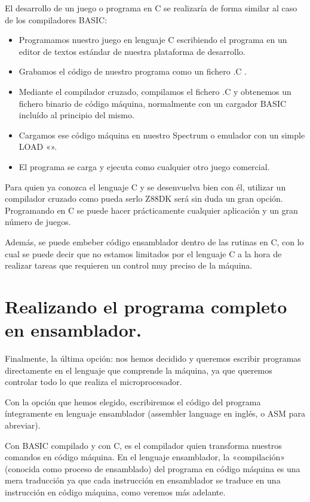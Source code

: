 \documentclass[letterpaper,10pt,spanish]{sphinxmanual}
\begin{document}
El desarrollo de un juego o programa en C se realizaría de forma similar al caso de los compiladores BASIC:
\begin{itemize}
\item {} 
Programamos nuestro juego en lenguaje C escribiendo el programa en un editor de textos estándar de nuestra plataforma de desarrollo.

\item {} 
Grabamos el código de nuestro programa como un fichero .C .

\item {} 
Mediante el compilador cruzado, compilamos el fichero .C y obtenemos un fichero binario de código máquina, normalmente con un cargador BASIC incluído al principio del mismo.

\item {} 
Cargamos ese código máquina en nuestro Spectrum o emulador con un simple LOAD «».

\item {} 
El programa se carga y ejecuta como cualquier otro juego comercial.

\end{itemize}

Para quien ya conozca el lenguaje C y se desenvuelva bien con él, utilizar un compilador cruzado como pueda serlo Z88DK será sin duda un gran opción. Programando en C se puede hacer prácticamente cualquier aplicación y un gran número de juegos.

Además, se puede embeber código ensamblador dentro de las rutinas en C, con lo cual se puede decir que no estamos limitados por el lenguaje C a la hora de realizar tareas que requieren un control muy preciso de la máquina.


\section{Realizando el programa completo en ensamblador.}
\label{\detokenize{02_introduccion/introduccion:realizando-el-programa-completo-en-ensamblador}}
Finalmente, la última opción: nos hemos decidido y queremos escribir programas directamente en el lenguaje que comprende la máquina, ya que queremos controlar todo lo que realiza el microprocesador.

Con la opción que hemos elegido, escribiremos el código del programa íntegramente en lenguaje ensamblador (assembler language en inglés, o ASM para abreviar).

Con BASIC compilado y con C, es el compilador quien transforma nuestros comandos en código máquina. En el lenguaje ensamblador, la «compilación» (conocida como proceso de ensamblado) del programa en código máquina es una mera traducción ya que cada instrucción en ensamblador se traduce en una instrucción en código máquina, como veremos más adelante.
\end{document}
